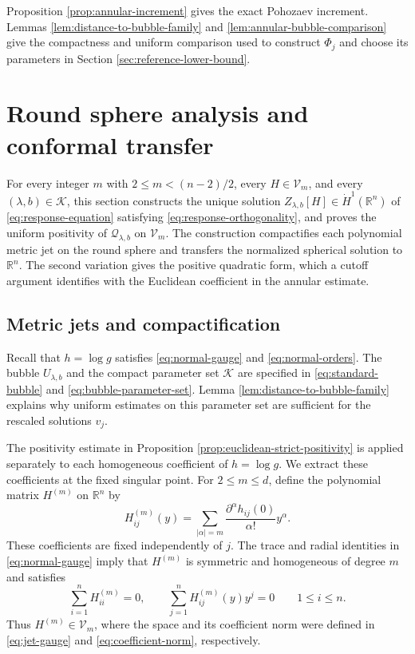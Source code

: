 \documentclass[11pt]{article}
\numberwithin{equation}{section}
\theoremstyle{remark}
\newcommand{\R}{\mathbb R}
\begin{document}
Proposition  \ref{prop:annular-increment} gives the exact Pohozaev
increment. Lemmas  \ref{lem:distance-to-bubble-family} and
\ref{lem:annular-bubble-comparison} give the compactness and uniform
comparison used to construct \(\Phi_j\) and choose its parameters in
Section  \ref{sec:reference-lower-bound}.

\section{Round sphere analysis and conformal transfer}
\label{sec:euclidean-response}

{
For every integer \(m\) with \(2\le m<(n-2)/2\), every
\(H\in\mathcal V_m\), and every \((\lambda,b)\in\mathcal K\),
this section constructs the unique solution
\(Z_{\lambda,b}[H]\in\dot H^1(\R^n)\) of
\eqref{eq:response-equation} satisfying
\eqref{eq:response-orthogonality}, and proves the uniform positivity
of \(\mathcal Q_{\lambda,b}\) on \(\mathcal V_m\). The construction
compactifies each polynomial metric jet on the round sphere and transfers
the normalized spherical solution to \(\R^n\). The second variation gives
the positive quadratic form, which a cutoff argument identifies with the
Euclidean coefficient in the annular estimate.
}

\subsection{Metric jets and compactification}

Recall that \(h=\log g\) satisfies \eqref{eq:normal-gauge} and
\eqref{eq:normal-orders}. The bubble \(U_{\lambda,b}\) and the compact
parameter set \(\mathcal K\) are specified in \eqref{eq:standard-bubble} and
\eqref{eq:bubble-parameter-set}. Lemma
\ref{lem:distance-to-bubble-family} explains why uniform estimates on this
parameter set are sufficient for the rescaled solutions \(v_j\).

\par

The positivity estimate in Proposition
\ref{prop:euclidean-strict-positivity} is applied separately to each
homogeneous coefficient of \(h=\log g\). We extract these coefficients
at the fixed singular point. For
\(2\le m\le d\), define the polynomial matrix
\(H^{(m)}\) on \(\R^n\) by
\begin{equation}\label{eq:metric-jets}
 H^{(m)}_{ij}(y)
 =\sum_{|\alpha|=m}\frac{\partial^\alpha h_{ij}(0)}{\alpha!}y^\alpha.
\end{equation}
These coefficients are fixed independently of \(j\).
The trace and radial identities in \eqref{eq:normal-gauge} imply that
\(H^{(m)}\) is symmetric and homogeneous of degree \(m\) and satisfies
\begin{equation}\label{eq:metric-jet-conditions}
 \sum_{i=1}^nH^{(m)}_{ii}=0,\qquad
 \sum_{j=1}^nH^{(m)}_{ij}(y)y^j=0
 \qquad 1\le i\le n.
\end{equation}
Thus \(H^{(m)}\in\mathcal V_m\), where the space and its coefficient
norm were defined in \eqref{eq:jet-gauge} and
\eqref{eq:coefficient-norm}, respectively.
\end{document}
